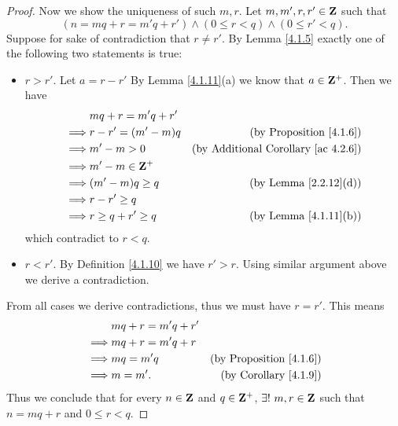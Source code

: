 \begin{proof}
    Now we show the uniqueness of such \(m, r\).
    Let \(m, m', r, r' \in \mathbf{Z}\) such that
    \[
        (n = mq + r = m'q + r') \land (0 \leq r < q) \land (0 \leq r' < q).
    \]
    Suppose for sake of contradiction that \(r \neq r'\).
    By Lemma \ref{4.1.5} exactly one of the following two statements is true:
    \begin{itemize}
        \item \(r > r'\).
              Let \(a = r - r'\)
              By Lemma \ref{4.1.11}(a) we know that \(a \in \mathbf{Z}^+\).
              Then we have
              \begin{align*}
                           & mq + r = m'q + r'                                                      \\
                  \implies & r - r' = (m' - m)q   & \text{(by Proposition \ref{4.1.6})}             \\
                  \implies & m' - m > 0           & \text{(by Additional Corollary \ref{ac 4.2.6})} \\
                  \implies & m' - m \in \mathbf{Z}^+                                                        \\
                  \implies & (m' - m)q \geq q     & \text{(by Lemma \ref{2.2.12}(d))}               \\
                  \implies & r - r' \geq q                                                          \\
                  \implies & r \geq q + r' \geq q & \text{(by Lemma \ref{4.1.11}(b))}
              \end{align*}
              which contradict to \(r < q\).
        \item \(r < r'\).
              By Definition \ref{4.1.10} we have \(r' > r\).
              Using similar argument above we derive a contradiction.
    \end{itemize}
    From all cases we derive contradictions, thus we must have \(r = r'\).
    This means
    \begin{align*}
                 & mq + r = m'q + r'                                       \\
        \implies & mq + r = m'q + r                                        \\
        \implies & mq = m'q          & \text{(by Proposition \ref{4.1.6})} \\
        \implies & m = m'.           & \text{(by Corollary \ref{4.1.9})}
    \end{align*}
    Thus we conclude that for every \(n \in \mathbf{Z}\) and \(q \in \mathbf{Z}^+\), \(\exists!\ m, r \in \mathbf{Z}\) such that \(n = mq + r\) and \(0 \leq r < q\).
\end{proof}

